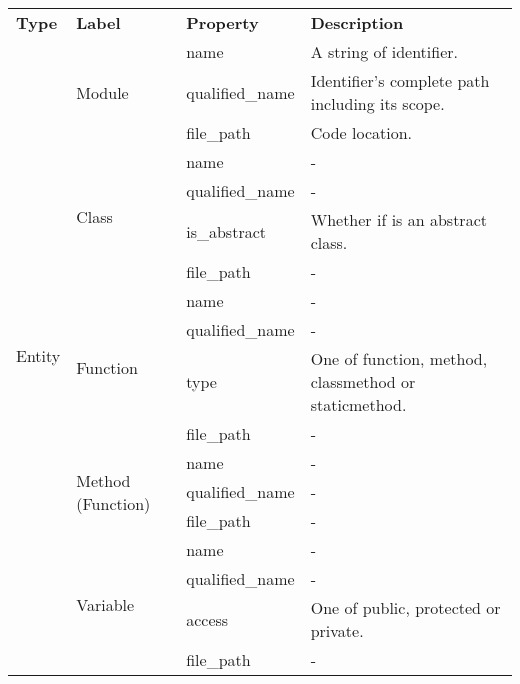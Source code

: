 \begin{tabular}{p{1.6cm}p{2.5cm}p{2cm}p{10cm}}
\toprule
\textbf{Type} & \textbf{Label} & \textbf{Property} & \textbf{Description} \\
\cmidrule{1-1}\cmidrule{2-2}\cmidrule{3-3}\cmidrule{4-4}
\multirow{18}{*}{Entity \bigstrut} & \multirow{3}{*}{Module \bigstrut} & name & A string of identifier. \\
\cmidrule{3-3}\cmidrule{4-4}
 &  & qualified\_name & Identifier's complete path including its scope. \\
\cmidrule{3-3}\cmidrule{4-4}
 &  & file\_path & Code location. \\
\cmidrule{2-2}\cmidrule{3-3}\cmidrule{4-4}
 & \multirow{4}{*}{Class \bigstrut} & name & - \\
\cmidrule{3-3}\cmidrule{4-4}
 &  & qualified\_name & - \\
\cmidrule{3-3}\cmidrule{4-4}
 &  & is\_abstract & Whether if is an abstract class. \\
\cmidrule{3-3}\cmidrule{4-4}
 &  & file\_path & - \\
\cmidrule{2-2}\cmidrule{3-3}\cmidrule{4-4}
 & \multirow{4}{*}{Function \bigstrut} & name & - \\
\cmidrule{3-3}\cmidrule{4-4}
 &  & qualified\_name & - \\
\cmidrule{3-3}\cmidrule{4-4}
 &  & type & One of function, method, classmethod or staticmethod. \\
\cmidrule{3-3}\cmidrule{4-4}
 &  & file\_path & - \\
\cmidrule{2-2}\cmidrule{3-3}\cmidrule{4-4}
 & \multirow{3}{*}{Method (Function) \bigstrut} & name & - \\
\cmidrule{3-3}\cmidrule{4-4}
 &  & qualified\_name & - \\
\cmidrule{3-3}\cmidrule{4-4}
 &  & file\_path & - \\
\cmidrule{2-2}\cmidrule{3-3}\cmidrule{4-4}
 & \multirow{4}{*}{Variable \bigstrut} & name & - \\
\cmidrule{3-3}\cmidrule{4-4}
 &  & qualified\_name & - \\
\cmidrule{3-3}\cmidrule{4-4}
 &  & access & One of public, protected or private. \\
\cmidrule{3-3}\cmidrule{4-4}
 &  & file\_path & - \\
\bottomrule
\end{tabular}


